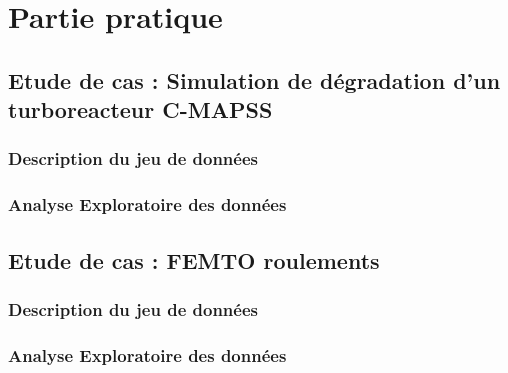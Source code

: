 \chapter{Partie pratique}
\section{Etude de cas : Simulation de dégradation d'un turboreacteur C-MAPSS}
\subsection{Description du jeu de données}
\subsection{Analyse Exploratoire des données}

\section{Etude de cas : FEMTO roulements}
\subsection{Description du jeu de données}
\subsection{Analyse Exploratoire des données}